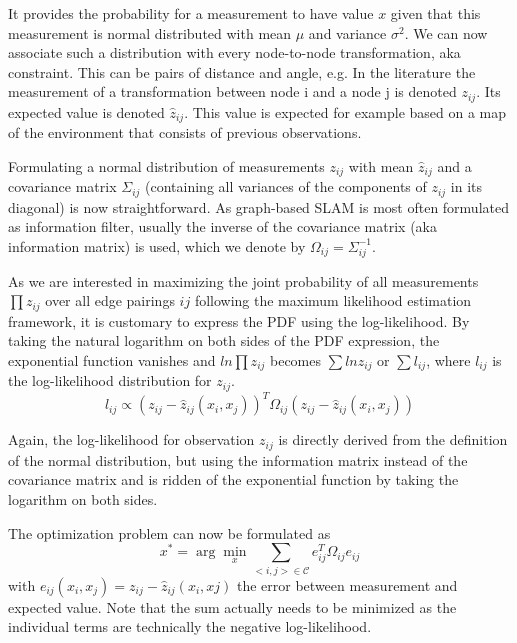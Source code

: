 It provides the probability for a measurement to have value $ x$ given that this measurement is normal distributed with mean $ \mu$ and variance $ \sigma^2$.  We can now associate such a distribution with every node-to-node transformation, aka constraint. This can be pairs of distance and angle, e.g. In the literature the measurement of a transformation between node i and a node j is denoted $ z_{ij}$. Its expected value is denoted $ \hat{z}_{ij}$. This value is expected for example based on a map of the environment that consists of previous observations.

Formulating a normal distribution of measurements $ z_{ij}$ with mean $ \hat{z}_{ij}$ and a covariance matrix $ \Sigma_{ij}$ (containing all variances of the components of $ z_{ij}$ in its diagonal) is now straightforward. As graph-based SLAM is most often formulated as  information filter, usually the inverse of the covariance matrix (aka information matrix) is used, which we denote by $ \Omega_{ij}=\Sigma_{ij}^{-1}$.

As we are interested in maximizing the joint probability of all measurements $ \prod{z_{ij}}$ over all edge pairings $ ij$ following the maximum likelihood estimation framework, it is customary to express the PDF using the log-likelihood. By taking the natural logarithm on both sides of the PDF expression, the exponential function vanishes and $ ln \prod{z_{ij}}$ becomes $ \sum{ ln z_{ij}}$ or $ \sum{l_{ij}}$, where $ l_{ij}$ is the log-likelihood distribution for $ z_{ij}$.
\begin{equation}
l_{ij} \propto (z_{ij}-\hat{z}_{ij}(x_i,x_j))^T\Omega_{ij}(z_{ij}-\hat{z}_{ij}(x_i,x_j))
\end{equation}

Again, the log-likelihood for observation $ z_{ij}$ is directly derived from the definition of the normal distribution, but using the information matrix instead of the covariance matrix and is ridden of the exponential function by taking the logarithm on both sides.

The optimization problem can now be formulated as
\begin{equation}
x^* = \arg \min_{x}\sum_{<i,j>\in \mathcal{C}}e_{ij}^T\Omega_{ij}e_{ij}
\end{equation}
with $ e_{ij}(x_i,x_j)=z_{ij}-\hat{z}_{ij}(x_i,xj)$ the error between measurement and expected value. Note that the sum actually needs to be minimized as the individual terms are technically the negative log-likelihood.


